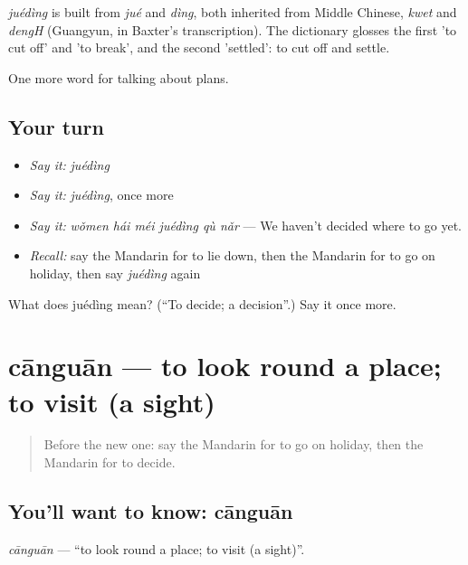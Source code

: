 \begin{cousinweb}
\emph{juédìng} is built from \emph{jué} and \emph{dìng}, both inherited from Middle Chinese, \emph{kwet} and \emph{dengH} (Guangyun, in Baxter's transcription). The dictionary glosses the first 'to cut off' and 'to break', and the second 'settled': to cut off and settle.
\end{cousinweb}

\begin{grammarlens}[title={What you've built}]
One more word for talking about plans.
\end{grammarlens}

\subsection*{Your turn}
\begin{itemize}
\raggedright
  \item \emph{Say it:} \emph{juédìng}
  \item \emph{Say it:} \emph{juédìng}, once more
  \item \emph{Say it:} \emph{wǒmen hái méi juédìng qù nǎr} — We haven't decided where to go yet.
  \item \emph{Recall:} say the Mandarin for to lie down, then the Mandarin for to go on holiday, then say \emph{juédìng} again
\end{itemize}

\begin{tcolorbox}[breakable,colback=teal!4,colframe=teal!35!black,title={Before you move on}]
What does juédìng mean? (\textquotedblleft{}To decide; a decision\textquotedblright{}.) Say it once more.
\end{tcolorbox}
\section[cānguān]{cānguān — to look round a place; to visit (a sight)}

\label{lesson:ZH-C184-canguan}



\begin{quote}
Before the new one: say the Mandarin for to go on holiday, then the Mandarin for to decide.
\end{quote}

\subsection*{You'll want to know: cānguān}
\emph{cānguān} — \textquotedblleft{}to look round a place; to visit (a sight)\textquotedblright{}.

